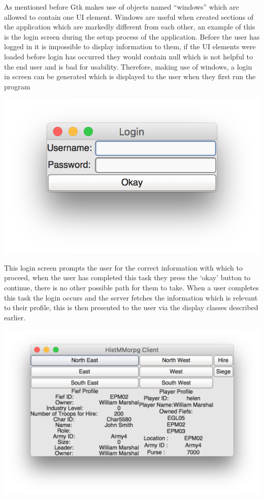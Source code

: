 \documentclass{article}
\begin{document}
As mentioned before Gtk makes use of objects named “windows” which are allowed to contain one UI element. Windows are useful when created sections of the application which are markedly different from each other, an example of this is the login screen during the setup process of the application. Before the user has logged in it is impossible to display information to them, if the UI elements were loaded before login has occurred they would contain null which is not helpful to the end user and is bad for usability. Therefore, making use of windows, a login in screen can be generated which is displayed to the user when they first run the program 
\begin{center}
\includegraphics[scale=1]{gtk1.png}
\end{center}
This login screen prompts the user for the correct information with which to proceed, when the user has completed this task they press the ‘okay’ button to continue, there is no other possible path for them to take. When a user completes this task the login occurs and the server fetches the information which is relevant to their profile, this is then presented to the user via the display classes described earlier.
\begin{center}
	\includegraphics[scale=.8]{gtk2.png}
\end{center}
\end{document}
